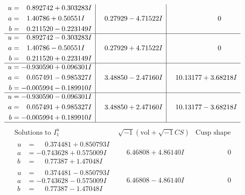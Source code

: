 \documentclass[1p]{elsarticle_modified}
\theoremstyle{definition}
\newcommand{\I}{\sqrt{-1}}
\begin{document}
$$\begin{array}{c|c|c}
\begin{aligned}
u &= \phantom{-}0.892742 + 0.303283 I \\
a &= \phantom{-}1.40786 + 0.50551 I \\
b &= \phantom{-}0.211520 - 0.223149 I\end{aligned}
 & \phantom{-}0.27929 - 4.71522 I & \phantom{-0.000000 } 0 \\ \hline\begin{aligned}
u &= \phantom{-}0.892742 - 0.303283 I \\
a &= \phantom{-}1.40786 - 0.50551 I \\
b &= \phantom{-}0.211520 + 0.223149 I\end{aligned}
 & \phantom{-}0.27929 + 4.71522 I & \phantom{-0.000000 } 0 \\ \hline\begin{aligned}
u &= -0.930590 + 0.096301 I \\
a &= \phantom{-}0.057491 - 0.985327 I \\
b &= -0.005994 - 0.189910 I\end{aligned}
 & \phantom{-}3.48850 - 2.47160 I & \phantom{-}10.13177 + 3.68218 I \\ \hline\begin{aligned}
u &= -0.930590 - 0.096301 I \\
a &= \phantom{-}0.057491 + 0.985327 I \\
b &= -0.005994 + 0.189910 I\end{aligned}
 & \phantom{-}3.48850 + 2.47160 I & \phantom{-}10.13177 - 3.68218 I\\
 \hline 
 \end{array}$$\newpage$$\begin{array}{c|c|c}  
\text{Solutions to }I^u_{1}& \I (\text{vol} + \sqrt{-1}CS) & \text{Cusp shape}\\
 \hline 
\begin{aligned}
u &= \phantom{-}0.374481 + 0.850793 I \\
a &= -0.743628 + 0.575009 I \\
b &= \phantom{-}0.77387 + 1.47048 I\end{aligned}
 & \phantom{-}6.46808 + 4.86140 I & \phantom{-0.000000 } 0 \\ \hline\begin{aligned}
u &= \phantom{-}0.374481 - 0.850793 I \\
a &= -0.743628 - 0.575009 I \\
b &= \phantom{-}0.77387 - 1.47048 I\end{aligned}
 & \phantom{-}6.46808 - 4.86140 I & \phantom{-0.000000 } 0 \\ \hline\begin{aligned}

\end{aligned}
\end{array}$$
\end{document}
